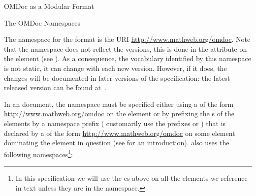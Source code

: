 \begin{tchapter}[id=spec-intro]{OMDoc as a Modular Format}
\begin{tsection}[id=omdoc-ns]{The OMDoc Namespaces}
  
  The namespace for the {\omdoc} format is the URI
  \url{http://www.mathweb.org/omdoc}. Note that the {\omdoc}
  namespace does not reflect the versions, this is done in the
  {} attribute on the {} element
  {} (see {}).  As a consequence, the
  {\omdoc} vocabulary identified by this namespace is not static, it can change with each
  new {\omdoc} version. However, if it does, the changes will be documented in later
  versions of the specification: the latest released version can be found
  at~\cite{URL:omdocspec}.

  In an {\omdoc} document, the {\omdoc} namespace must be specified either using a
  {} of the form
  {}\url{http://www.mathweb.org/omdoc}{} on the
  {} element or by prefixing the {s} of the {\omdoc}
  elements by a namespace prefix ({\omdoc} customarily use the prefixes {}
  or {}) that is declared by a {} of
  the form {}\url{http://www.mathweb.org/omdoc}{} on some
  element dominating the {\omdoc} element in question (see {} for an
  introduction). {\omdoc} also uses the following namespaces\footnote{In this
    specification we will use the {es} above on all the
    elements we reference in text unless they are in the {\omdoc} namespace.}:


\end{tsection}
\end{tchapter}
